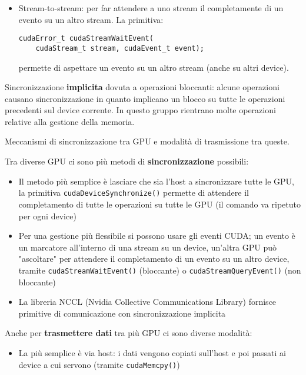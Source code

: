 \begin{questions}
\begin{solution}
\begin{itemize}
            \item Stream-to-stream: per far attendere a uno stream il completamente di un evento su un altro stream. La primitiva:
            \begin{verbatim}
cudaError_t cudaStreamWaitEvent(
    cudaStream_t stream, cudaEvent_t event);
            \end{verbatim}
            permette di aspettare un evento su un altro stream (anche su altri device).
        \end{itemize}
        
        Sincronizzazione \textbf{implicita} dovuta a operazioni bloccanti: alcune operazioni causano sincronizzazione in quanto implicano un blocco su tutte le operazioni precedenti sul device corrente. In questo gruppo rientrano molte operazioni relative alla gestione della memoria.
        
    \end{solution}
    
    \question Meccanismi di sincronizzazione tra GPU e modalità di trasmissione tra queste.
    
    \begin{solution}
        Tra diverse GPU ci sono più metodi di \textbf{sincronizzazione} possibili: 
        \begin{itemize}
            \item Il metodo più semplice è lasciare che sia l'host a sincronizzare tutte le GPU, la primitiva \texttt{cudaDeviceSynchronize()} permette di attendere il completamento di tutte le operazioni su tutte le GPU (il comando va ripetuto per ogni device)
            
            \item Per una gestione più flessibile si possono usare gli eventi CUDA; un evento è un marcatore all'interno di una stream su un device, un'altra GPU può "ascoltare" per attendere il completamento di un evento su un altro device, tramite \texttt{cudaStreamWaitEvent()} (bloccante) o \texttt{cudaStreamQueryEvent()} (non bloccante)
            
            \item La libreria NCCL (Nvidia Collective Communications Library) fornisce primitive di comunicazione con sincronizzazione implicita
        \end{itemize}
        
        Anche per \textbf{trasmettere dati} tra più GPU ci sono diverse modalità:
        \begin{itemize}
            \item La più semplice è via host: i dati vengono copiati sull'host e poi passati ai device a cui servono (tramite \texttt{cudaMemcpy()})
            

\end{itemize}
\end{solution}
\end{questions}

